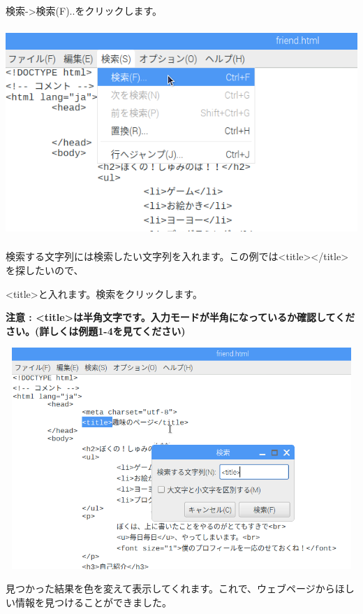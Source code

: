 \documentclass[a4paper,12pt,dvipdfmx]{jarticle}
\begin{document}
検索-{\textgreater}検索(F)..をクリックします。

\begin{center}
\includegraphics[width=16.533cm,height=7.918cm]{textbook-img010.png}

\end{center}
\clearpage
検索する文字列には検索したい文字列を入れます。この例では{\textless}title{\textgreater}{\textless}/title{\textgreater}を探したいので、

{\textless}title{\textgreater}と入れます。検索をクリックします。

{\bfseries
注意 :
{\textless}title{\textgreater}は半角文字です。入力モードが半角になっているか確認してください。(詳しくは例題1-4を見てください)}


\begin{center}
\includegraphics[width=16.625cm,height=8.371cm]{textbook-img012.png}

\end{center}
見つかった結果を色を変えて表示してくれます。これで、ウェブページからほしい情報を見つけることができました。
\end{document}
